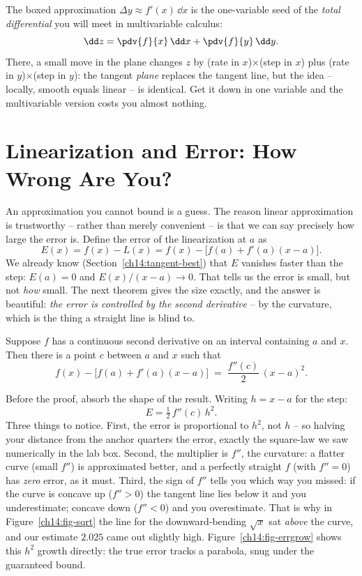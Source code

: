 \begin{connectionbox}
The boxed approximation $\Delta y \approx f'(x)\,\dd x$ is the one-variable seed
of the \emph{total differential} you will meet in multivariable calculus:
\[
\dd z = \pdv{f}{x}\,\dd x + \pdv{f}{y}\,\dd y.
\]
There, a small move in the plane changes $z$ by (rate in $x$)$\times$(step in
$x$) plus (rate in $y$)$\times$(step in $y$): the tangent \emph{plane} replaces
the tangent line, but the idea -- locally, smooth equals linear -- is
identical. Get it down in one variable and the multivariable version costs you
almost nothing.
\end{connectionbox}

\section{Linearization and Error: How Wrong Are You?}
\label{ch14:error}

An approximation you cannot bound is a guess. The reason linear approximation is
trustworthy -- rather than merely convenient -- is that we can say precisely how
large the error is. Define the error of the linearization at $a$ as
\[
E(x) = f(x) - L(x) = f(x) - \big[f(a)+f'(a)(x-a)\big].
\]
We already know (Section~\ref{ch14:tangent-best}) that $E$ vanishes faster than
the step: $E(a)=0$ and $E(x)/(x-a)\to 0$. That tells us the error is small, but
not \emph{how} small. The next theorem gives the size exactly, and the answer is
beautiful: \emph{the error is controlled by the second derivative} -- by the
curvature, which is the thing a straight line is blind to.

\begin{theorem}
\label{ch14:thm-error}
Suppose $f$ has a continuous second derivative on an interval containing $a$ and
$x$. Then there is a point $c$ between $a$ and $x$ such that
\[
f(x) - \big[f(a) + f'(a)(x-a)\big] \;=\; \frac{f''(c)}{2}\,(x-a)^2.
\]
\end{theorem}

Before the proof, absorb the shape of the result. Writing $h = x-a$ for the step:
\[
E = \tfrac12\, f''(c)\, h^2.
\]
Three things to notice. First, the error is proportional to $h^2$, not $h$ -- so
halving your distance from the anchor quarters the error, exactly the square-law
we saw numerically in the lab box. Second, the multiplier is $f''$, the
curvature: a flatter curve (small $f''$) is approximated better, and a perfectly
straight $f$ (with $f''=0$) has \emph{zero} error, as it must. Third, the sign of
$f''$ tells you which way you missed: if the curve is concave up ($f''>0$) the
tangent line lies below it and you underestimate; concave down ($f''<0$) and you
overestimate. That is why in Figure~\ref{ch14:fig-sqrt} the line for the
downward-bending $\sqrt{x}$ sat \emph{above} the curve, and our estimate $2.025$
came out slightly high. Figure~\ref{ch14:fig-errgrow} shows this $h^2$ growth
directly: the true error tracks a parabola, snug under the guaranteed bound.


